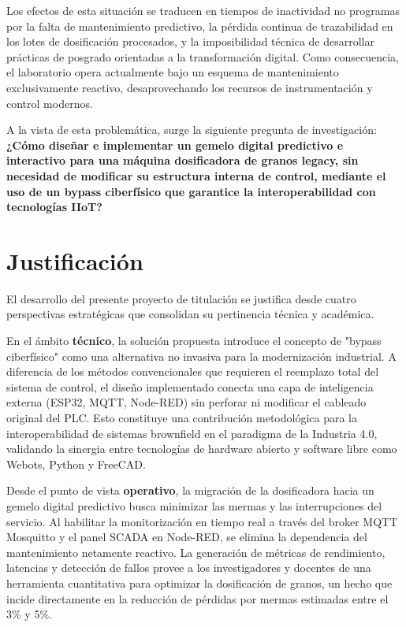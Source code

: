 Los efectos de esta situación se traducen en tiempos de inactividad no programas por la falta de mantenimiento predictivo, la pérdida continua de trazabilidad en los lotes de dosificación procesados, y la imposibilidad técnica de desarrollar prácticas de posgrado orientadas a la transformación digital. Como consecuencia, el laboratorio opera actualmente bajo un esquema de mantenimiento exclusivamente reactivo, desaprovechando los recursos de instrumentación y control modernos.

A la vista de esta problemática, surge la siguiente pregunta de investigación: \textbf{¿Cómo diseñar e implementar un gemelo digital predictivo e interactivo para una máquina dosificadora de granos legacy, sin necesidad de modificar su estructura interna de control, mediante el uso de un bypass ciberfísico que garantice la interoperabilidad con tecnologías IIoT?}

\section{Justificación}

El desarrollo del presente proyecto de titulación se justifica desde cuatro perspectivas estratégicas que consolidan su pertinencia técnica y académica.

En el ámbito \textbf{técnico}, la solución propuesta introduce el concepto de "bypass ciberfísico" como una alternativa no invasiva para la modernización industrial. A diferencia de los métodos convencionales que requieren el reemplazo total del sistema de control, el diseño implementado conecta una capa de inteligencia externa (ESP32, MQTT, Node-RED) sin perforar ni modificar el cableado original del PLC. Esto constituye una contribución metodológica para la interoperabilidad de sistemas brownfield en el paradigma de la Industria 4.0, validando la sinergia entre tecnologías de hardware abierto y software libre como Webots, Python y FreeCAD.

Desde el punto de vista \textbf{operativo}, la migración de la dosificadora hacia un gemelo digital predictivo busca minimizar las mermas y las interrupciones del servicio. Al habilitar la monitorización en tiempo real a través del broker MQTT Mosquitto y el panel SCADA en Node-RED, se elimina la dependencia del mantenimiento netamente reactivo. La generación de métricas de rendimiento, latencias y detección de fallos provee a los investigadores y docentes de una herramienta cuantitativa para optimizar la dosificación de granos, un hecho que incide directamente en la reducción de pérdidas por mermas estimadas entre el 3\% y 5\%.

